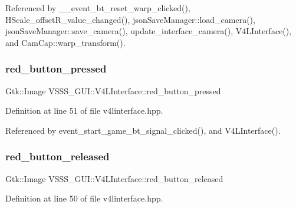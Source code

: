 Referenced by \+\_\+\+\_\+event\+\_\+bt\+\_\+reset\+\_\+warp\+\_\+clicked(), H\+Scale\+\_\+offset\+R\+\_\+value\+\_\+changed(), json\+Save\+Manager\+::load\+\_\+camera(), json\+Save\+Manager\+::save\+\_\+camera(), update\+\_\+interface\+\_\+camera(), V4\+L\+Interface(), and Cam\+Cap\+::warp\+\_\+transform().

\mbox{\label{class_v_s_s_s___g_u_i_1_1_v4_l_interface_a095096c714eef1dde0abc7a0eca41d06}} 
\subsubsection{\texorpdfstring{red\+\_\+button\+\_\+pressed}{red\_button\_pressed}}
{\footnotesize\ttfamily Gtk\+::\+Image V\+S\+S\+S\+\_\+\+G\+U\+I\+::\+V4\+L\+Interface\+::red\+\_\+button\+\_\+pressed}



Definition at line 51 of file v4linterface.\+hpp.



Referenced by event\+\_\+start\+\_\+game\+\_\+bt\+\_\+signal\+\_\+clicked(), and V4\+L\+Interface().

\mbox{\label{class_v_s_s_s___g_u_i_1_1_v4_l_interface_aadf59dd8bae5ef012842bdab1bef100d}} 
\subsubsection{\texorpdfstring{red\+\_\+button\+\_\+released}{red\_button\_released}}
{\footnotesize\ttfamily Gtk\+::\+Image V\+S\+S\+S\+\_\+\+G\+U\+I\+::\+V4\+L\+Interface\+::red\+\_\+button\+\_\+released}



Definition at line 50 of file v4linterface.\+hpp.




